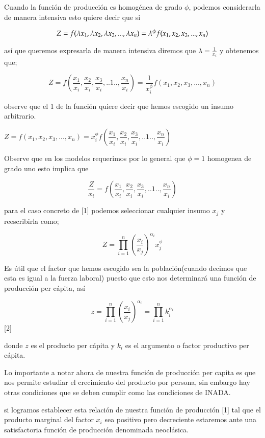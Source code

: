 \documentclass[12pt]{article}
\begin{document}
Cuando la función de producción es homogénea de grado $\phi$, podemos considerarla de manera intensiva esto quiere decir que si

 
$$Z=f(\lambda x_1,\lambda x_2,\lambda x_3,...,\lambda x_n)\\ =
\lambda^{\phi}f(x_1,x_2,x_3,...,x_n) $$

así que queremos expresarla de manera intensiva diremos que $\lambda=\frac{1}{x_{i}}$
y obtenemos que;


$$Z=f( \dfrac{x_1}{x_i},\dfrac{x_2}{x_i},\dfrac{x_3}{x_i},..1..,\dfrac{x_n}{x_i}) =
\dfrac{1}{x_i^{\phi}}f(x_1,x_2,x_3,...,x_n) $$

observe que el 1 de la función quiere decir que hemos escogido un insumo arbitrario. 

$Z = f(x_1,x_2,x_3,...,x_n) =  x_i^\phi f( \dfrac{x_1}{x_i},\dfrac{x_2}{x_i},\dfrac{x_3}{x_i},..1..,\dfrac{x_n}{x_i})$

Observe que en los modelos requerimos por lo general que $\phi=1$ homogenea de grado uno esto implica que 

$$
\dfrac{Z}{x_i}=f( \dfrac{x_1}{x_i},\dfrac{x_2}{x_i},\dfrac{x_3}{x_i},..1..,\dfrac{x_n}{x_i})$$

para el caso concreto de [1] podemos seleccionar cualquier insumo $x_j$ y reescribirla como; 


$$Z=\prod_{i=1}^n \left( \frac{x_i}{x_j}\right)^{\alpha_i} x_j^{\phi}$$






Es útil que el factor que hemos escogido sea la población(cuando decimos que esta es igual a la fuerza laboral) puesto que esto nos determinará una función de producción per cápita, así


 $$z=\prod_{i=1}^n \left( \frac{x_i}{x_j}\right)^{\alpha_i}  =\prod_{i=1}^n k_{i}^{\alpha_i}$$  [2]

donde $z$ es el producto per cápita y $k_{i}$ es el argumento o factor productivo per cápita.

Lo importante a notar ahora de nuestra función de producción per capita es que nos permite estudiar el crecimiento del producto por persona, sin embargo hay otras condiciones que se deben cumplir como las condiciones de INADA.

si logramos establecer esta relación de nuestra función de producción [1] tal que el producto marginal del factor $x_{i}$ sea positivo pero decreciente estaremos ante una satisfactoria función de producción denominada neoclásica.
\end{document}
